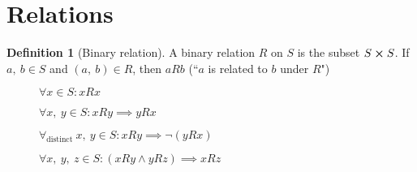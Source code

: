 \documentclass{article}
\theoremstyle{plain}
\numberwithin{theorem}{section}
\theoremstyle{definition}
\newtheorem{definition}{Definition}[section]
\numberwithin{definition}{section}
\begin{document}
\section{Relations}
\begin{definition}[Binary relation]
	A binary relation $R$ on $S$ is the subset $S\cross S$.
	If $a, \: b \in S$ and  $(a, \: b) \in R$,
	then $aRb$ (``$a$ is related to $b$ under $R$")
\end{definition}
%
\begin{figure}[H]
\begin{mdframed}[style=exampledefault,frametitle={Relation properties}]
\begin{description}[style=sameline]
	\item[Reflexive]
		$\forall x \in S : xRx$
	\item[Symmetric]
		$\forall x,\: y \in S : xRy \implies yRx$
	\item[Antisymmetric]
		$\forall_\text{distinct} \: x,\: y \in S : xRy \implies \neg (yRx)$
	\item[Transitive]
		$\forall x,\: y, \: z \in S : (xRy \land yRz) \implies xRz$
\end{description}
\end{mdframed}
\end{figure}
%
\end{document}
